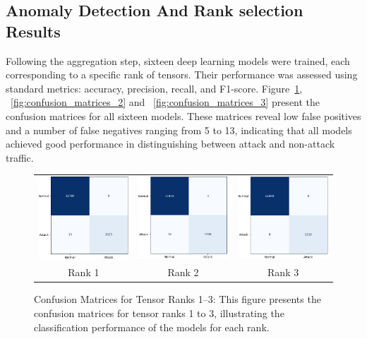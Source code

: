 \documentclass[pdflatex,sn-mathphys-num]{sn-jnl}
\theoremstyle{thmstyleone}
\theoremstyle{thmstyletwo}
\theoremstyle{thmstylethree}
\begin{document}
\subsection{Anomaly Detection And Rank selection Results}
 Following the aggregation step, sixteen deep learning models were trained, each corresponding to a specific rank of tensors. Their performance was assessed using standard metrics: accuracy, precision, recall, and F1-score. Figure~\ref{fig:confusion_matrices_1}, ~\ref{fig:confusion_matrices_2} and ~\ref{fig:confusion_matrices_3} present the confusion matrices for all sixteen models. These matrices reveal low false positives and a number of false negatives ranging from 5 to 13, indicating that all models achieved good performance in distinguishing between attack and non-attack traffic.

\begin{figure}[H]
    \centering
    \begin{tabular}{ccc}
        \includegraphics[width=0.3\linewidth]{rank_1.png} &
        \includegraphics[width=0.3\linewidth]{rank_2.png} &
        \includegraphics[width=0.3\linewidth]{rank_3.png} \\
        \small Rank 1 & \small Rank 2 & \small Rank 3 \\[6pt]
    \end{tabular}
    \caption{Confusion Matrices for Tensor Ranks 1–3: This figure presents the confusion matrices for tensor ranks 1 to 3, illustrating the classification performance of the models for each rank.}
    \label{fig:confusion_matrices_1}
\end{figure}
\end{document}
